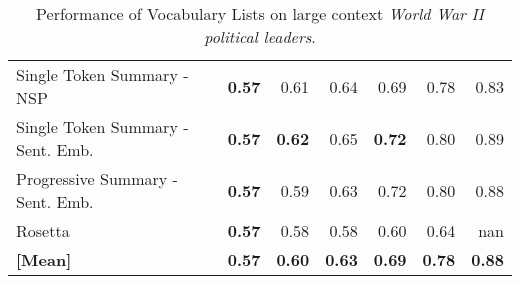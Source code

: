 \begin{table}[H]
{\begin{tabular}{lrrrrrr}
Single Token Summary - NSP & \cellcolor[RGB]{58,76,192}\textbf{0.57} & \cellcolor[RGB]{96,128,232}0.61 & \cellcolor[RGB]{123,158,248}0.64 & \cellcolor[RGB]{178,203,251}0.69 & \cellcolor[RGB]{245,192,167}0.78 & \cellcolor[RGB]{234,125,97}0.83 \\
Single Token Summary - Sent. Emb. & \cellcolor[RGB]{58,76,192}\textbf{0.57} & \cellcolor[RGB]{101,134,236}\textbf{0.62} & \cellcolor[RGB]{134,169,252}0.65 & \cellcolor[RGB]{211,219,230}\textbf{0.72} & \cellcolor[RGB]{246,167,137}0.80 & \cellcolor[RGB]{188,31,44}0.89 \\
Progressive Summary - Sent. Emb. & \cellcolor[RGB]{58,76,192}\textbf{0.57} & \cellcolor[RGB]{76,102,214}0.59 & \cellcolor[RGB]{115,149,244}0.63 & \cellcolor[RGB]{206,217,235}0.72 & \cellcolor[RGB]{247,174,145}0.80 & \cellcolor[RGB]{190,35,45}0.88 \\
Rosetta & \cellcolor[RGB]{58,76,192}\textbf{0.57} & \cellcolor[RGB]{63,83,198}0.58 & \cellcolor[RGB]{67,90,204}0.58 & \cellcolor[RGB]{86,115,224}0.60 & \cellcolor[RGB]{126,161,249}0.64 & \cellcolor[RGB]{0,0,0}nan \\
\midrule 
\textbf{[Mean]} & \textbf{0.57} & \textbf{0.60} & \textbf{0.63} & \textbf{0.69} & \textbf{0.78} & \textbf{0.88} \\
\bottomrule
\end{tabular}
    }
        \caption{Performance of Vocabulary Lists on large context \textit{World War II political leaders}.}\end{table}
